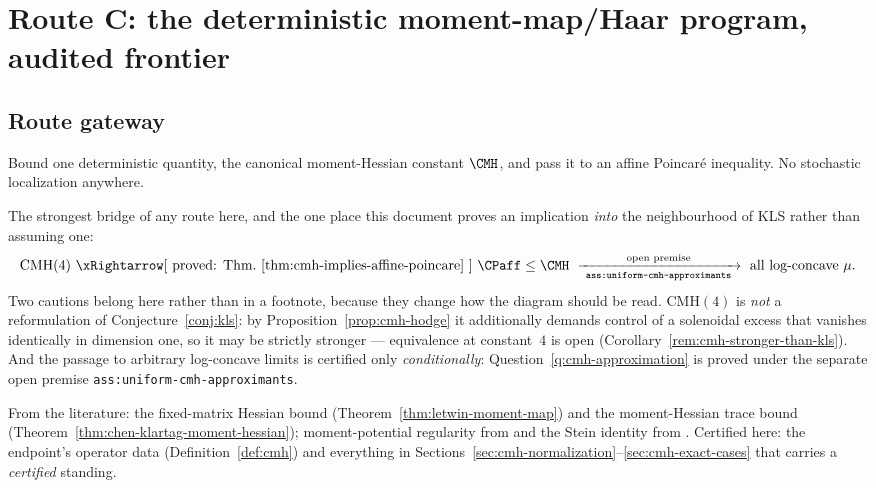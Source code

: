 \documentclass[../../main.tex]{subfiles}
\begin{document}
\section{Route C: the deterministic moment-map/Haar program, audited frontier}
\label{sec:moment-map-cmh}

\subsection*{Route gateway}

\begin{description}[leftmargin=0pt,style=nextline,itemsep=0.3em]
  \item[1. Thesis.] Bound one deterministic quantity, the canonical moment-Hessian constant
  $\CMH$, and pass it to an affine Poincar\'e inequality. No stochastic localization anywhere.

  \item[2. Bridge to KLS.] The strongest bridge of any route here, and the one place this
  document proves an implication \emph{into} the neighbourhood of KLS rather than assuming one:
  \[
    \mathrm{CMH}(4)
    \ \xRightarrow[\ \text{proved: Thm.~\ref{thm:cmh-implies-affine-poincare}}\ ]{}\
    \CPaff\le\CMH
    \ \xrightarrow[\ \texttt{ass:uniform-cmh-approximants}\ ]{\ \text{open premise}\ }\
    \text{all log-concave }\mu .
  \]
  Two cautions belong here rather than in a footnote, because they change how the diagram
  should be read. $\mathrm{CMH}(4)$ is \emph{not} a reformulation of
  Conjecture~\ref{conj:kls}: by Proposition~\ref{prop:cmh-hodge} it additionally demands
  control of a solenoidal excess that vanishes identically in dimension one, so it may be
  strictly stronger --- equivalence at constant~$4$ is open
  (Corollary~\ref{rem:cmh-stronger-than-kls}). And the passage to arbitrary log-concave limits
  is certified only \emph{conditionally}: Question~\ref{q:cmh-approximation} is proved under
  the separate open premise \texttt{ass:uniform-cmh-approximants}.

  \item[3. Established inputs.] From the literature: the fixed-matrix Hessian bound
  (Theorem~\ref{thm:letwin-moment-map}) and the moment-Hessian trace bound
  (Theorem~\ref{thm:chen-klartag-moment-hessian}); moment-potential regularity from
  \cite{BermanBerndtsson2013RealMA} and the Stein identity from
  \cite{Fathi2019SteinMomentMaps}. Certified here: the endpoint's operator data
  (Definition~\ref{def:cmh}) and everything in
  Sections~\ref{sec:cmh-normalization}--\ref{sec:cmh-exact-cases} that carries a
  \emph{certified} standing.


\end{description}
\end{document}
